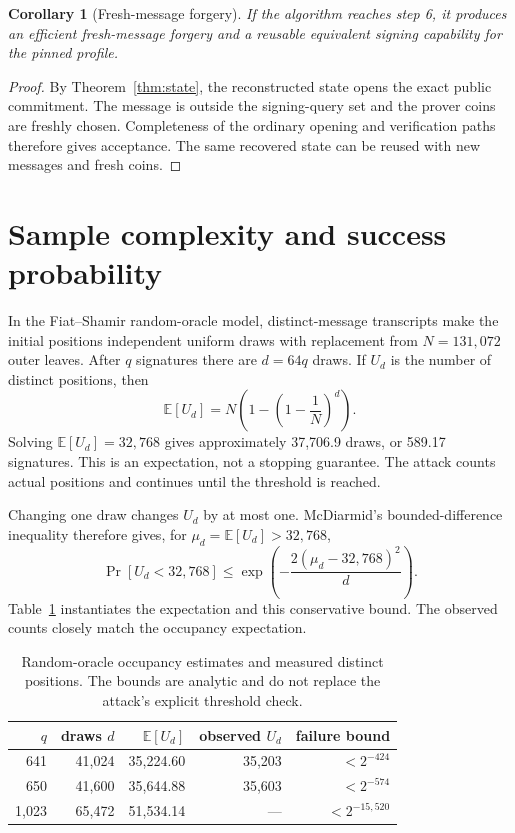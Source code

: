 \documentclass[10pt,a4paper]{article}
\newtheorem{corollary}{Corollary}
\begin{document}
\begin{corollary}[Fresh-message forgery]
If the algorithm reaches step 6, it produces an efficient fresh-message
forgery and a reusable equivalent signing capability for the pinned profile.
\end{corollary}

\begin{proof}
By Theorem~\ref{thm:state}, the reconstructed state opens the exact public
commitment. The message is outside the signing-query set and the prover coins
are freshly chosen. Completeness of the ordinary opening and verification paths
therefore gives acceptance. The same recovered state can be reused with new
messages and fresh coins.
\end{proof}

\section{Sample complexity and success probability}
\label{sec:probability}

In the Fiat--Shamir random-oracle model, distinct-message transcripts make the
initial positions independent uniform draws with replacement from
$N=131{,}072$ outer leaves. After $q$ signatures there are $d=64q$ draws. If
$U_d$ is the number of distinct positions, then
\begin{equation}
  \mathbb E[U_d]
  =N\left(1-\left(1-\frac1N\right)^d\right).
  \label{eq:occupancy}
\end{equation}
Solving $\mathbb E[U_d]=32{,}768$ gives approximately 37,706.9 draws, or
589.17 signatures. This is an expectation, not a stopping guarantee. The
attack counts actual positions and continues until the threshold is reached.

Changing one draw changes $U_d$ by at most one. McDiarmid's bounded-difference
inequality therefore gives, for $\mu_d=\mathbb E[U_d]>32{,}768$,
\begin{equation}
 \Pr[U_d<32{,}768]
 \leq \exp\left(-\frac{2(\mu_d-32{,}768)^2}{d}\right).
 \label{eq:mcdiarmid}
\end{equation}
Table~\ref{tab:probability} instantiates the expectation and this conservative
bound. The observed counts closely match the occupancy expectation.

\begin{table}[ht]
\centering
\small
\begin{tabular}{@{}rrrrr@{}}
\toprule
$q$ & draws $d$ & $\mathbb E[U_d]$ & observed $U_d$ & failure bound \\
\midrule
641 & 41,024 & 35,224.60 & 35,203 & $<2^{-424}$ \\
650 & 41,600 & 35,644.88 & 35,603 & $<2^{-574}$ \\
1,023 & 65,472 & 51,534.14 & --- & $<2^{-15{,}520}$ \\
\bottomrule
\end{tabular}
\caption{Random-oracle occupancy estimates and measured distinct positions.
The bounds are analytic and do not replace the attack's explicit threshold
check.}
\label{tab:probability}
\end{table}
\end{document}
